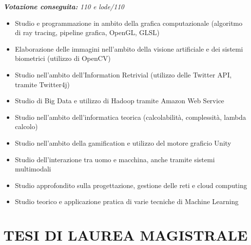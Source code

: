 \documentclass[11pt,a4paper,sans]{moderncv} %
\begin{document}
{
	\newline{}
	\textit{\textbf{Votazione conseguita:} 110 e lode/110}
}
{
	\begin{itemize}
		\item Studio e programmazione in ambito della grafica computazionale (algoritmo di ray tracing, pipeline grafica, OpenGL, GLSL)
		\item Elaborazione delle immagini nell'ambito della visione artificiale e dei sistemi biometrici (utilizzo di OpenCV)
		\item Studio nell'ambito dell'Information Retrivial (utilizzo delle Twitter API, tramite Twitter4j)
		\item Studio di Big Data e utilizzo di Hadoop tramite Amazon Web Service
		\item Studio nell'ambito dell'informatica teorica (calcolabilit\`{a}, complessit\`{a}, lambda calcolo)
		\item Studio nell'ambito della gamification e utilizzo del motore graficio Unity
		\item Studio dell'interazione tra uomo e macchina, anche tramite sistemi multimodali
		\item Studio approfondito sulla progettazione, gestione delle reti e cloud computing
		\item Studio teorico e applicazione pratica di varie tecniche di Machine Learning
	\end{itemize}
}

\section{TESI DI LAUREA MAGISTRALE}


\end{document}
